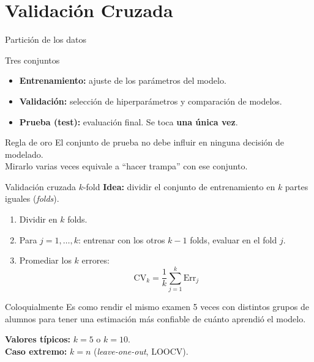 \documentclass[aspectratio=169]{beamer}
\begin{document}
\section{Validación Cruzada}

\begin{frame}{Partición de los datos}
  \begin{block}{Tres conjuntos}
    \begin{itemize}
      \item \textbf{Entrenamiento:} ajuste de los parámetros del modelo.
      \item \textbf{Validación:} selección de hiperparámetros y comparación de modelos.
      \item \textbf{Prueba (test):} evaluación final. Se toca \textbf{una única vez}.
    \end{itemize}
  \end{block}

  \medskip
  \begin{alertblock}{Regla de oro}
    El conjunto de prueba no debe influir en ninguna decisión de modelado.\\
    Mirarlo varias veces equivale a ``hacer trampa'' con ese conjunto.
  \end{alertblock}
\end{frame}

\begin{frame}{Validación cruzada $k$-fold}
  \textbf{Idea:} dividir el conjunto de entrenamiento en $k$ partes iguales (\textit{folds}).

  \medskip
  \begin{enumerate}
    \item Dividir en $k$ folds.
    \item Para $j = 1, \ldots, k$: entrenar con los otros $k-1$ folds, evaluar en el fold $j$.
    \item Promediar los $k$ errores:
    \[
      \text{CV}_k = \frac{1}{k}\sum_{j=1}^{k} \text{Err}_j
    \]
  \end{enumerate}

  \medskip
  \begin{exampleblock}{Coloquialmente}
    Es como rendir el mismo examen 5 veces con distintos grupos de alumnos para
    tener una estimación más confiable de cuánto aprendió el modelo.
  \end{exampleblock}

  \medskip
  \textbf{Valores típicos:} $k = 5$ o $k = 10$.\\
  \textbf{Caso extremo:} $k = n$ (\textit{leave-one-out}, LOOCV).
\end{frame}
\end{document}
